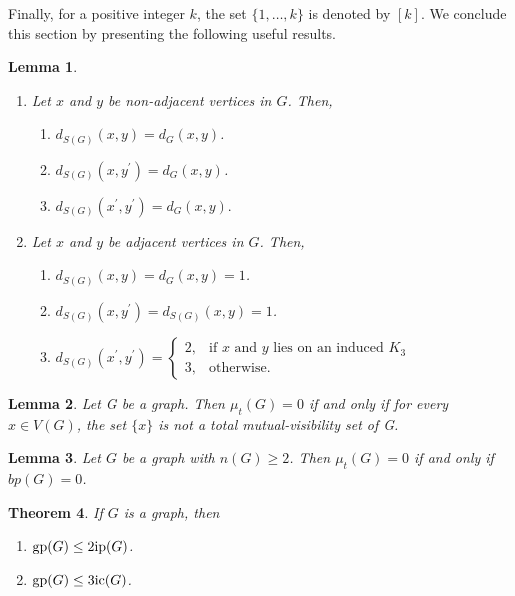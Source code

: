 \documentclass[a4paper,12pt]{article}
\newtheorem{theorem}{Theorem}[section]
\newtheorem{lemma}[theorem]{Lemma}
\newcommand{\gp}{{\rm gp}}
\newcommand{\ip}{{\rm ip}}
\newcommand{\ic}{{\rm ic}}
\begin{document}
{Finally, for a positive integer $k$, the set $\{1, \dots, k\}$ is denoted by $[k]$. We conclude this section by presenting the following useful results.

\begin{lemma}\mbox{\upshape\cite{5}} \label{distance_shadow}
    
\begin{enumerate}
    \item  Let $x$ and $y$ be non-adjacent vertices in $G$. Then,
    \begin{enumerate}
        \item  $d_{S(G)} (x, y) = d_{G}(x, y)$.
        \item $d_{S(G)}(x, y^{\prime}) = d_{G}(x, y)$.
        \item $d_{S(G)}(x^{\prime},y^{\prime}) = d_G(x,y).$
    \end{enumerate}
   \item Let $x$ and $y$ be adjacent vertices in $G$. Then,
   \begin{enumerate}
       \item  $d_{S(G)}(x, y)= d_{G}(x, y) = 1$.
       \item  $d_{S(G)}(x, y^{\prime})= d_{S(G)}(x, y) = 1$.
       \item $d_{S(G)}(x^{\prime},y^{\prime}) = \begin{cases}
        2, & \text{if } x \text{ and } y \text{ lies on an induced } K_3\\
    
        3, & \text{otherwise}.
    \end{cases}$
   \end{enumerate}
\end{enumerate}





\end{lemma}


\begin{lemma} \mbox{\upshape\cite{mv7}}\label{total1}
Let G be a graph. Then $\mu_{t}(G) = 0$ if and only if for every $x \in V (G)$, the set $\{x\}$ is not a total mutual-visibility set of G.
\end{lemma}
\begin{lemma} \mbox{\upshape\cite{mv7}}\label{total2}
Let $G$ be a graph with $n(G) \geq 2$. Then $\mu_t(G) = 0$ if and only if
$bp(G) = 0$.
\end{lemma}

\begin{theorem}\mbox{\upshape\cite{19}}\label{gp-bound}
    If $G$ is a graph, then
    \begin{enumerate}
        \item $\gp(G) \leq 2\ip(G)$.
        \item $\gp(G) \leq 3\ic(G)$.
    \end{enumerate}
\end{theorem} 
}
\end{document}
